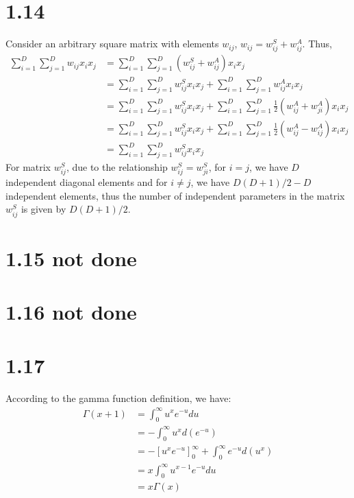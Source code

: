 \documentclass[10pt,a4paper,draft]{book}
\begin{document}
\section*{1.14}
Consider an arbitrary square matrix with elements $w_{ij}$, $w_{ij} = w_{ij}^S + w_{ij}^A$. Thus,
\begin{equation}
\begin{aligned}
\sum_{i=1}^D \sum_{j=1}^D w_{ij} x_i x_j &= \sum_{i=1}^D \sum_{j=1}^D (w_{ij}^S + w_{ij}^A) x_i x_j \\
&= \sum_{i=1}^D \sum_{j=1}^D w_{ij}^S x_i x_j + \sum_{i=1}^D \sum_{j=1}^D w_{ij}^A x_i x_j \\
&= \sum_{i=1}^D \sum_{j=1}^D w_{ij}^S x_i x_j + \sum_{i=1}^D \sum_{j=1}^D \frac{1}{2}(w_{ij}^A + w_{ji}^A) x_i x_j \\
&= \sum_{i=1}^D \sum_{j=1}^D w_{ij}^S x_i x_j + \sum_{i=1}^D \sum_{j=1}^D \frac{1}{2}(w_{ij}^A - w_{ij}^A) x_i x_j \\
&= \sum_{i=1}^D \sum_{j=1}^D w_{ij}^S x_i x_j
\end{aligned}
\end{equation}
For matrix $w_{ij}^S$, due to the relationship $w_{ij}^S = w_{ji}^S$, for $i=j$, we have $D$ independent diagonal elements and for $i\ne j$, we have $D(D+1)/2 - D$ independent elements, thus the number of independent parameters in the matrix $w_{ij}^S$ is given by $D(D+1)/2$.

\section*{1.15 not done}

\section*{1.16 not done}

\section*{1.17}
According to the gamma function definition, we have:
\begin{equation}
\begin{aligned}
\Gamma(x+1) &= \int_0^{\infty} u^{x}e^{-u} du \\
&= -\int_0^{\infty} u^x d(e^{-u}) \\
&= -[u^x e^{-u}]_{0}^{\infty} +  \int_0^{\infty}  e^{-u} d(u^x) \\
&= x\int_0^{\infty}  u^{x-1}e^{-u}du \\
&= x \Gamma(x)
\end{aligned}
\end{equation}
\end{document}
